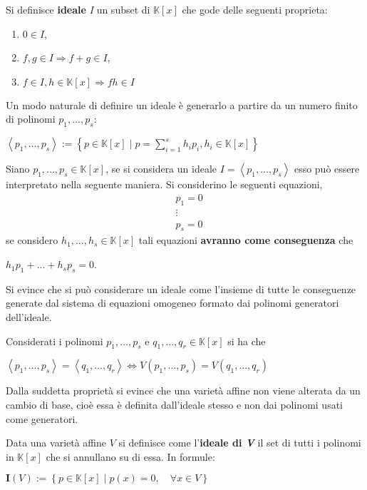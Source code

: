 \begin{defn}
	Si definisce \textbf{ideale} \textit{I} un subset di $\mathbb{K}[x]$ che gode delle seguenti proprieta:
	\begin{enumerate}
		\item $0 \in I $,
		\item $f, g \in I \Rightarrow f + g \in I$,
		\item $f \in I, h \in \mathbb{K}[x] \Rightarrow fh \in I$
	\end{enumerate}
\end{defn}
Un modo naturale di definire un ideale è generarlo a partire da un numero finito di polinomi $p_1, ..., p_s$:
\begin{center}
	$\left\langle p_1, ..., p_s \right\rangle := \left\lbrace p \in \mathbb{K}[x] \; | \; p = \sum_{i = 1}^{s} h_ip_i, h_i \in \mathbb{K}[x] \right\rbrace $
\end{center}
Siano $p_1, ..., p_s \in \mathbb{K}[x]$, se si considera un ideale $I = \left\langle p_1, ..., p_s \right\rangle$ esso può essere interpretato nella seguente maniera. Si considerino le seguenti equazioni,
\begin{align}
\nonumber
& p_1 = 0 \\
\nonumber
& \vdots\\
\nonumber
& p_s = 0
\end{align}
se considero $h_1, ..., h_s \in \mathbb{K}[x]$ tali equazioni \textbf{avranno come conseguenza} che
\begin{center}
	$h_1p_1 + ... + h_sp_s = 0$.
\end{center}
Si evince che si può considerare un ideale come l'insieme di tutte le conseguenze generate dal sistema di equazioni omogeneo formato dai polinomi generatori dell'ideale.
\begin{prop}
	Considerati i polinomi $p_1, ..., p_s$ e $q_1, ..., q_r \in \mathbb{K}[x]$ si ha che
	\begin{center}
		$\left\langle p_1, ..., p_s \right\rangle = \left\langle q_1, ..., q_r \right\rangle \Leftrightarrow V(p_1, ..., p_s) = V(q_1, ..., q_r)$
	\end{center}
\end{prop}
Dalla suddetta proprietà si evince che una varietà affine non viene alterata da un cambio di base, cioè essa è definita dall'ideale stesso e non dai polinomi usati come generatori.
\begin{defn}
	Data una varietà affine $V$ si definisce come l'\textbf{ideale di \textit{V}} il set di tutti i polinomi in $\mathbb{K}[x]$ che si annullano su di essa. In formule:
	\begin{center}
		$\mathbf{I}(V) := \left\lbrace p \in \mathbb{K}[x] \; | \; p(x) = 0, \quad \forall x \in V \right\rbrace $
	\end{center}
\end{defn}
